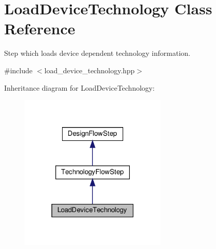 \hypertarget{classLoadDeviceTechnology}{}\section{Load\+Device\+Technology Class Reference}
\label{classLoadDeviceTechnology}


Step which loads device dependent technology information.  




{\ttfamily \#include $<$load\+\_\+device\+\_\+technology.\+hpp$>$}



Inheritance diagram for Load\+Device\+Technology\+:
\nopagebreak
\begin{figure}[H]
\begin{center}
\leavevmode
\includegraphics[width=199pt]{dc/d88/classLoadDeviceTechnology__inherit__graph}
\end{center}
\end{figure}



